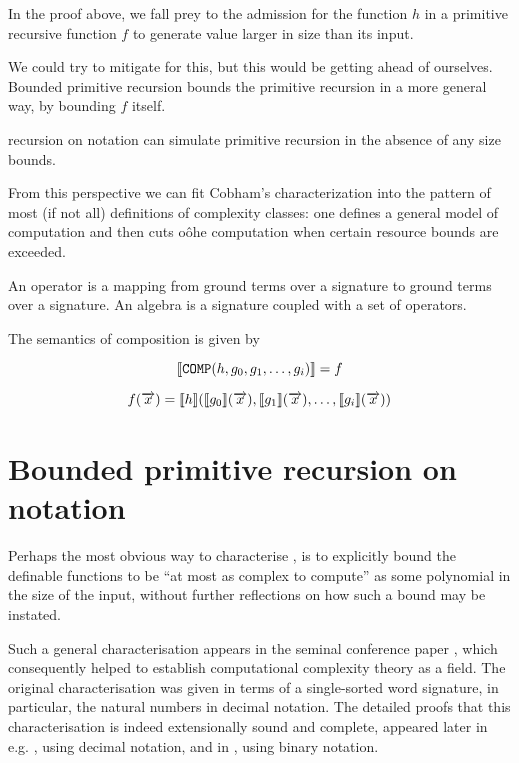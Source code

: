 In the proof above, we fall prey to the admission for the function $h$ in a
primitive recursive function $f$ to generate value larger in size than its
input.

We could try to mitigate for this, but this would be getting ahead of
ourselves. Bounded primitive recursion bounds the primitive recursion in a more
general way, by bounding $f$ itself.

recursion on notation can simulate primitive recursion in the absence of any
size bounds\cite{bellantoni-phd-1992}.

From this perspective we can fit Cobham's characterization into the pattern of
most (if not all) definitions of complexity classes: one defines a general
model of computation and then cuts oôhe computation when certain resource
bounds are exceeded.

An operator is a mapping from ground terms over a signature to ground terms
over a signature. An algebra is a signature coupled with a set of operators.

The semantics of composition is given by

$$\mathopen{}\left\llbracket{\mathtt{COMP}{\ensuremath{\mathopen{}\left({h,g_0,g_1,\ldots,g_i}\right)\mathclose{}}}}\right\rrbracket\mathclose{} = f$$

\begin{align*}
%
f\p{\vect{x}} = \sem{h}\p{\sem{g_0}\p{\vect{x}}, \sem{g_1}\p{\vect{x}}, \ldots,
\sem{g_i}\p{\vect{x}}}
%
\end{align*}

\section{Bounded primitive recursion on notation}

Perhaps the most obvious way to characterise \FPTIME{}, is to explicitly bound
the definable functions to be ``at most as complex to compute'' as some
polynomial in the size of the input, without further reflections on how such a
bound may be instated.

Such a general characterisation appears in the seminal conference paper
\cite{cobham-1965}, which consequently helped to establish computational
complexity theory as a field\cite{clote-1999}. The original characterisation
was given in terms of a single-sorted word signature, in particular, the
natural numbers in decimal notation. The detailed proofs that this
characterisation is indeed extensionally sound and complete, appeared later in
e.g.  \cite{rose-1984}, using decimal notation, and in \cite{tourlakis-1984,
clote-1999}, using binary notation.

